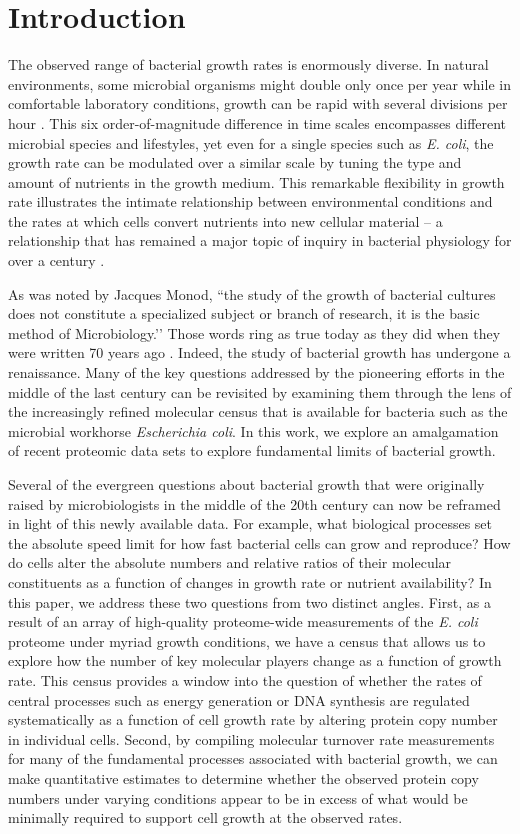 \section{Introduction}
The observed range of bacterial growth rates is enormously diverse. In
natural environments, some microbial organisms might double only once per
year \citep{mikucki2009} while in comfortable laboratory conditions, growth
can be rapid with several divisions per hour \citep{schaechter1958}. This six
order-of-magnitude difference in time scales encompasses different microbial
species and lifestyles, yet even for a single species such as \textit{E.
coli}, the growth rate can be modulated over a similar scale by tuning the
type and amount of nutrients in the growth medium. This remarkable
flexibility in growth rate illustrates the intimate relationship between
environmental conditions and the rates at which cells convert nutrients into
new cellular material -- a relationship that has remained a major topic of
inquiry in bacterial physiology for over a century \citep{jun2018}.

As was noted by Jacques Monod, ``the study of the growth of bacterial
cultures does not constitute a specialized subject or branch of research, it
is the basic method of Microbiology.’’ Those words ring as true today as they
did when they were written 70 years ago \citep{monod1949}. Indeed, the study
of bacterial growth has undergone a renaissance. Many of the key questions
addressed by the pioneering efforts in the middle of the last century can be
revisited by examining them through the lens of the increasingly refined
molecular census that is available for bacteria such as the microbial
workhorse \textit{Escherichia coli}. In this work, we explore an amalgamation
of recent proteomic data sets to explore fundamental limits of bacterial growth.

Several of the evergreen questions about bacterial growth that were originally
raised by microbiologists in the middle of the 20th century can now be reframed
in light of this newly available data. For example, what biological
processes set the absolute speed limit for how fast bacterial cells can grow and
reproduce? How do cells alter the absolute numbers and relative ratios of their
molecular constituents as a function of changes in growth rate or nutrient
availability? In this paper, we address these two questions from two distinct
angles. First, as a result of an array of high-quality proteome-wide
measurements of the \textit{E. coli} proteome under myriad growth
conditions, we have a census that allows us to explore how the number of key
molecular players change as a function of growth rate. This census provides a
window into the question of whether the rates of central processes such as
energy generation or DNA synthesis are regulated systematically as a function of
cell growth rate by altering protein copy number in individual cells. Second, by
compiling molecular turnover rate measurements for many of the fundamental
processes associated with bacterial growth, we can make quantitative estimates
to determine whether the observed protein copy numbers under varying conditions
appear to be in excess of what would be minimally required to support cell
growth at the observed rates.

